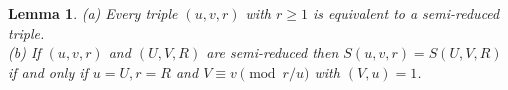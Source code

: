 \documentclass[12pt, a4paper,  reqno, english]{amsart}%
\numberwithin{equation}{section}
\newtheorem{lemma}{Lemma}
\theoremstyle{definition}
\renewcommand{\geq}{\geqslant}
\newcommand{\acom}[1]{{\color{red}{ #1}} }
\begin{document}



\begin{lemma}  \label{lem: 1} (a) Every triple $(u,v,r)$ with $r\geq 1$  is equivalent to a semi-reduced triple. \\
(b)   If  $(u,v,r)$ and $(U,V,R)$ are semi-reduced then $S(u,v,r)=S(U,V,R)$ if and only if $u=U, r=R$ and $V\equiv v  \pmod {r/u}$ with $(V,u)=1$.
  \end{lemma}
 
\end{document}
